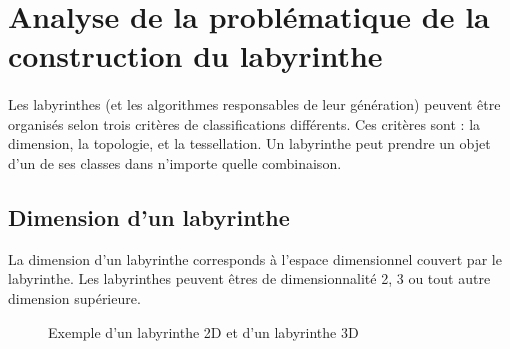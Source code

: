 \section{Analyse de la problématique de la construction du labyrinthe} 
\label{sec:ProblematiqueConstructionLabyrinthe}
\paragraph{}
Les labyrinthes (et les algorithmes responsables de leur génération) peuvent être organisés selon trois critères de  classifications différents. Ces critères sont : la dimension, la topologie, et la tessellation. Un labyrinthe peut prendre un objet d'un de ses classes dans n'importe quelle combinaison.

\subsection{Dimension d'un labyrinthe}
La dimension d'un labyrinthe corresponds à l'espace dimensionnel couvert par le labyrinthe. Les labyrinthes peuvent êtres de dimensionnalité 2, 3 ou tout autre dimension supérieure.

\begin{figure}[htp] 
    \centering
    \hfill%
    \caption{Exemple d'un labyrinthe 2D et d'un labyrinthe 3D}
\end{figure}

